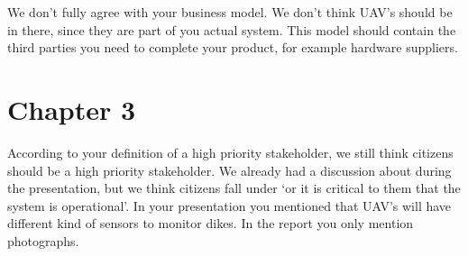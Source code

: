 \documentclass[a4paper,10pt]{article}
\begin{document}
We don't fully agree with your business model. We don't think UAV's should be in there, since they are part of you actual system. This model should contain the third parties you need to complete your product, for example hardware suppliers.

\section{Chapter 3}
According to your definition of a high priority stakeholder, we still think citizens should be a high priority stakeholder. We already had a discussion about during the presentation, but we think citizens fall under `or it is critical to them that the system is operational'.
In your presentation you mentioned that UAV's will have different kind of sensors to monitor dikes. In the report you only mention photographs.
\end{document}
